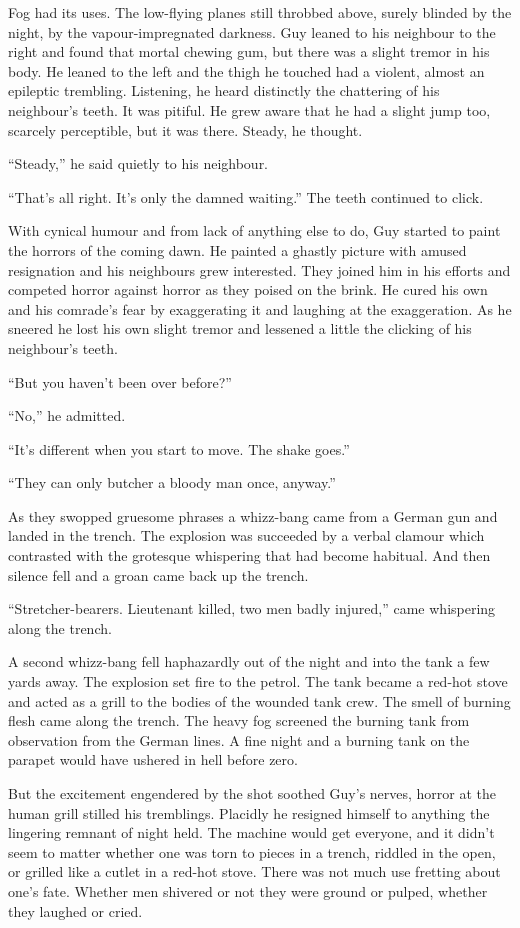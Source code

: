 Fog had its uses. The low-flying planes still throbbed above, surely blinded by the night, by the vapour-impregnated darkness. Guy leaned to his neighbour to the right and found that mortal chewing gum, but there was a slight tremor in his body. He leaned to the left and the thigh he touched had a violent, almost an epileptic trembling. Listening, he heard distinctly the chattering of his neighbour's teeth. It was pitiful. He grew aware that he had a slight jump too, scarcely perceptible, but it was there. Steady, he thought.

``Steady,'' he said quietly to his neighbour.

``That's all right. It's only the damned waiting.'' The teeth continued to click.

With cynical humour and from lack of anything else to do, Guy started to paint the horrors of the coming dawn. He painted a ghastly picture with amused resignation and his neighbours grew interested. They joined him in his efforts and competed horror against horror as they poised on the brink. He cured his own and his comrade's fear by exaggerating it and laughing at the exaggeration. As he sneered he lost his own slight tremor and lessened a little the clicking of his neighbour's teeth.

``But you haven't been over before?''

``No,'' he admitted.

``It's different when you start to move. The shake goes.''

``They can only butcher a bloody man once, anyway.''

As they swopped gruesome phrases a whizz-bang came from a German gun and landed in the trench. The explosion was succeeded by a verbal clamour which contrasted with the grotesque whispering that had become habitual. And then silence fell and a groan came back up the trench.

``Stretcher-bearers. Lieutenant killed, two men badly injured,'' came whispering along the trench.

A second whizz-bang fell haphazardly out of the night and into the tank a few yards away. The explosion set fire to the petrol. The tank became a red-hot stove and acted as a grill to the bodies of the wounded tank crew. The smell of burning flesh came along the trench. The heavy fog screened the burning tank from observation from the German lines. A fine night and a burning tank on the parapet would have ushered in hell before zero.

But the excitement engendered by the shot soothed Guy's nerves, horror at the human grill stilled his tremblings. Placidly he resigned himself to anything the lingering remnant of night held. The machine would get everyone, and it didn't seem to matter whether one was torn to pieces in a trench, riddled in the open, or grilled like a cutlet in a red-hot stove. There was not much use fretting about one's fate. Whether men shivered or not they were ground or pulped, whether they laughed or cried.

